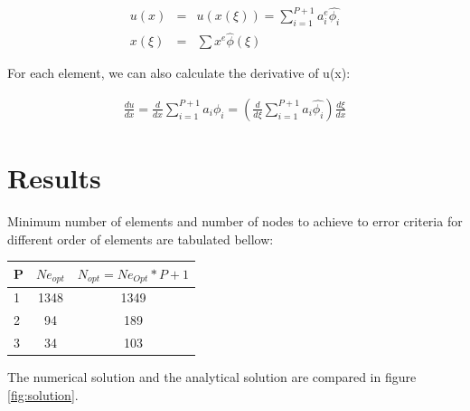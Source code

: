 \documentclass[paper=a4, fontsize=11pt]{article} %
\begin{document}
\begin{eqnarray}
 u(x) &=& u(x(\xi))=\sum_{i=1}^{P+1} a_i^e \hat{\phi_i}\nonumber\\
 x(\xi) &=& \sum x^e \hat{\phi}(\xi)
 \end{eqnarray} 

For each element, we can also calculate the derivative of u(x):

\begin{eqnarray}
\frac{du}{dx} = \frac{d}{dx} \sum_{i=1}^{P+1} a_i \phi_i = (\frac{d}{d\xi}\sum_{i=1}^{P+1} a_i \hat{\phi_i})\frac{d\xi}{dx}
\end{eqnarray}

\section{Results}

Minimum number of elements and number of nodes to achieve to error criteria for different order of elements are tabulated bellow: 

\begin{center}
  \begin{tabular}{ l | c | c}
    \hline
    P & $Ne_{opt}$ & $N_{opt} = Ne_{Opt} * P + 1 $\\ \hline
    1 & 1348 & 1349\\ \hline
    2 &  94 & 189\\ \hline
    3 & 34 & 103\\ \hline
    \hline
  \end{tabular}
\end{center}

The numerical solution and the analytical solution are compared in figure \ref{fig:solution}. 
\end{document}

